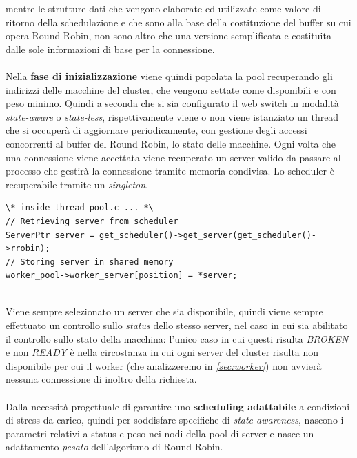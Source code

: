 \documentclass[italian]{tktltiki2}
\begin{document}
mentre le strutture dati che vengono elaborate ed utilizzate come valore di ritorno della schedulazione e che sono alla base della costituzione del buffer su cui opera Round Robin, non sono altro che una versione semplificata e costituita dalle sole informazioni di base per la connessione. \\\\
Nella \textbf{fase di inizializzazione} viene quindi popolata la pool recuperando gli indirizzi delle macchine del cluster, che vengono settate come disponibili e con peso minimo. Quindi a seconda che si sia configurato il web switch in modalità \emph{state-aware} o \emph{state-less}, rispettivamente viene o non viene istanziato un thread che si occuperà di aggiornare periodicamente, con gestione degli accessi concorrenti al buffer del Round Robin, lo stato delle macchine. Ogni volta che una connessione viene accettata viene recuperato un server valido da passare al processo che gestirà la connessione tramite memoria condivisa. Lo scheduler è recuperabile tramite un \emph{singleton}.
\begin{lstlisting}
\* inside thread_pool.c ... *\
// Retrieving server from scheduler
ServerPtr server = get_scheduler()->get_server(get_scheduler()->rrobin);
// Storing server in shared memory
worker_pool->worker_server[position] = *server;
	
\end{lstlisting}
Viene sempre selezionato un server che sia disponibile, quindi viene sempre effettuato un controllo sullo \emph{status} dello stesso server, nel caso in cui sia abilitato il controllo sullo stato della macchina: l'unico caso in cui questi risulta \emph{BROKEN} e non \emph{READY} è nella circostanza in cui ogni server del cluster risulta non disponibile per cui il worker (che analizzeremo in \emph{\ref{sec:worker}}) non avvierà nessuna connessione di inoltro della richiesta. 
\\
\\
Dalla necessità progettuale di garantire uno \textbf{scheduling adattabile} a condizioni di stress da carico, quindi per soddisfare specifiche di \emph{state-awareness}, nascono i parametri relativi a status e peso nei nodi della pool di server e nasce un adattamento \emph{pesato} dell'algoritmo di Round Robin. 
\end{document}
